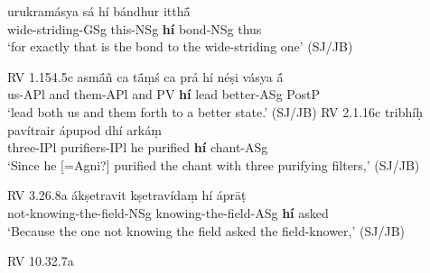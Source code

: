 \documentclass[output=paper,
modfonts
]{LSP/langsci}
\begin{document}

\begin{exe}
\ex\label{hiexc}
	\begin{xlist}
	\ex\gll urukramásya sá hí bándhur itthā́ \\
			wide-striding-GSg this-NSg \textbf{hí} bond-NSg thus \\
		\glt `for exactly that is the bond to the wide-striding one' (SJ/JB)
		
		\hfill {RV 1.154.5c}
	\ex\gll asmā́ñ ca tā́ṃś ca prá hí néṣi vásya ā́ \\
			us-APl and them-APl and PV \textbf{hí} lead better-ASg PostP \\
		\glt `lead both us and them forth to a better state.' (SJ/JB) \hfill {RV 2.1.16c} 
	\ex\gll tribhíḥ pavítrair ápupod dhí arkáṃ \\
			three-IPl purifiers-IPl {he purified} \textbf{hí} chant-ASg \\
		\glt `Since he [=Agni?] purified the chant with three purifying filters,' (SJ/JB)
		
		\hfill {RV 3.26.8a}
	\ex\gll ákṣetravit kṣetravídaṃ hí áprāṭ \\
			not-knowing-the-field-NSg knowing-the-field-ASg \textbf{hí} asked \\
		\glt `Because the one not knowing the field asked the field-knower,' (SJ/JB)
		
		\hfill {RV 10.32.7a}
	\end{xlist}
\end{exe}
\end{document}
